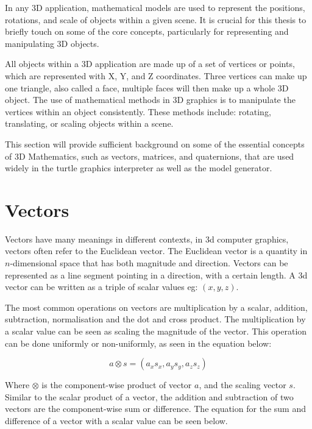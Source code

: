 
In any 3D application, mathematical models are used to represent the positions, rotations, and scale of objects within a given scene. It is crucial for this thesis to briefly touch on some of the core concepts, particularly for representing and manipulating 3D objects. 

All objects within a 3D application are made up of a set of vertices or points, which are represented with X, Y, and Z coordinates. Three vertices can make up one triangle, also called a face, multiple faces will then make up a whole 3D object. The use of mathematical methods in 3D graphics is to manipulate the vertices within an object consistently.  These methods include: rotating, translating, or scaling objects within a scene. 

This section will provide sufficient background on some of the essential concepts of 3D Mathematics, such as vectors, matrices, and quaternions, that are used widely in the turtle graphics interpreter as well as the model generator.

\section{Vectors}

Vectors have many meanings in different contexts, in \acrshort{3d} computer graphics, vectors often refer to the Euclidean vector. The Euclidean vector is a quantity in $n$-dimensional space that has both magnitude and direction. Vectors can be represented as a line segment pointing in a direction, with a certain length. A \acrshort{3d} vector can be written as a triple of scalar values eg: $(x, y, z)$.

The most common operations on vectors are multiplication by a scalar, addition, subtraction, normalisation and the dot and cross product. The multiplication by a scalar value can be seen as scaling the magnitude of the vector. This operation can be done uniformly or non-uniformly, as seen in the equation below:

\begin{equation}
a \otimes s = (a_x s_x, a_y s_y, a_z s_z)
\end{equation}

\noindent
Where $\otimes$ is the component-wise product of vector $a$, and the scaling vector $s$. Similar to the scalar product of a vector, the addition and subtraction of two vectors are the component-wise sum or difference. The equation for the sum and difference of a vector with a scalar value can be seen below. 

